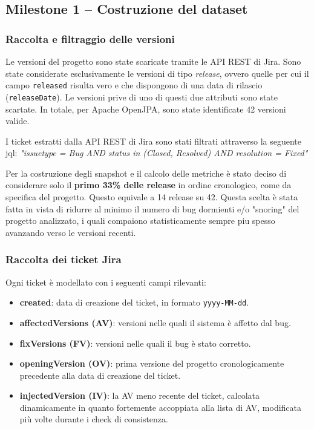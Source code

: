 \subsection{Milestone 1 -- Costruzione del dataset}

\subsubsection{Raccolta e filtraggio delle versioni}

Le versioni del progetto sono state scaricate tramite le API REST di Jira. Sono state
considerate esclusivamente le versioni di tipo \emph{release}, ovvero quelle per cui il
campo \texttt{released} risulta vero e che dispongono di una data di rilascio
(\texttt{releaseDate}). Le versioni prive di uno di questi due attributi sono state
scartate. In totale, per Apache OpenJPA, sono state identificate 42 versioni valide.

I ticket estratti dalla API REST di Jira sono stati filtrati attraverso la seguente jql:
\textit{"issuetype = Bug AND status in (Closed, Resolved) AND resolution = Fixed"}

Per la costruzione degli snapshot e il calcolo delle metriche è stato deciso di
considerare solo il \textbf{primo 33\% delle release} in ordine cronologico, come da
specifica del progetto. Questo equivale a 14 release su 42. Questa scelta è stata fatta in vista di ridurre al minimo il numero di bug dormienti e/o "snoring" del progetto analizzato, i quali compaiono statisticamente sempre piu spesso avanzando verso le versioni recenti.

\subsubsection{Raccolta dei ticket Jira}

Ogni ticket è modellato con i seguenti campi rilevanti:
\begin{itemize}
    \item \textbf{created}: data di creazione del ticket, in formato \texttt{yyyy-MM-dd}.
    \item \textbf{affectedVersions (AV)}: versioni nelle quali il sistema è affetto dal bug.
    \item \textbf{fixVersions (FV)}: versioni nelle quali il bug è stato corretto.
    \item \textbf{openingVersion (OV)}: prima versione del progetto cronologicamente
    precedente alla data di creazione del ticket.
    \item \textbf{injectedVersion (IV)}: la AV meno recente del ticket, calcolata
    dinamicamente in quanto fortemente accoppiata alla lista di AV, modificata più volte
    durante i check di consistenza.
\end{itemize}

